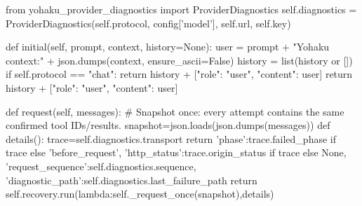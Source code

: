         from yohaku_provider_diagnostics import ProviderDiagnostics
        self.diagnostics = ProviderDiagnostics(self.protocol, config['model'], self.url, self.key)

    def initial(self, prompt, context, history=None):
        user = prompt + "\n\nCurrent Yohaku context:\n" + json.dumps(context, ensure_ascii=False)
        history = list(history or [])
        if self.protocol == "chat":
            return history + [{"role": "user", "content": user}]
        return history + [{"role": "user", "content": user}]

    def request(self, messages):
        # Snapshot once: every attempt contains the same confirmed tool IDs/results.
        snapshot=json.loads(json.dumps(messages))
        def details():
            trace=self.diagnostics.transport
            return {'phase':trace.failed_phase if trace else 'before_request',
                    'http_status':trace.origin_status if trace else None,
                    'request_sequence':self.diagnostics.sequence,
                    'diagnostic_path':self.diagnostics.last_failure_path}
        return self.recovery.run(lambda:self._request_once(snapshot),details)

